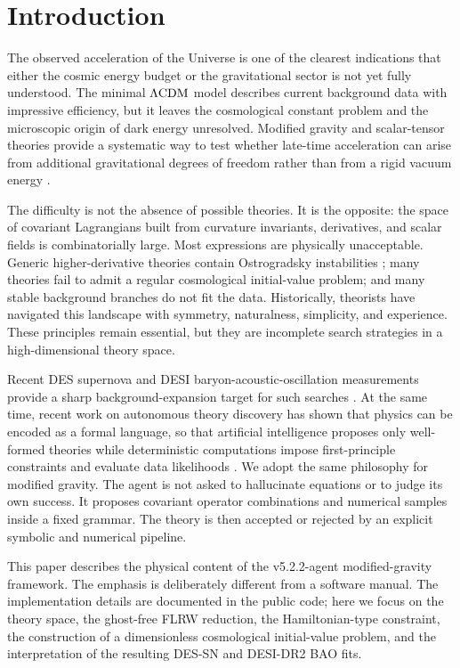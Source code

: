 \documentclass[aps,prd,twocolumn,superscriptaddress,nofootinbib,longbibliography]{revtex4-2}
\newcommand{\LCDM}{\Lambda{\rm CDM}}
\begin{document}
\section{Introduction}
\label{sec:introduction}

The observed acceleration of the Universe is one of the clearest indications that either the cosmic energy budget or the gravitational sector is not yet fully understood.  The minimal $\LCDM$ model describes current background data with impressive efficiency, but it leaves the cosmological constant problem and the microscopic origin of dark energy unresolved.  Modified gravity and scalar-tensor theories provide a systematic way to test whether late-time acceleration can arise from additional gravitational degrees of freedom rather than from a rigid vacuum energy \cite{Clifton2012,SotiriouFaraoni2010,Horndeski1974}.

The difficulty is not the absence of possible theories.  It is the opposite: the space of covariant Lagrangians built from curvature invariants, derivatives, and scalar fields is combinatorially large.  Most expressions are physically unacceptable.  Generic higher-derivative theories contain Ostrogradsky instabilities \cite{Ostrogradsky1850}; many theories fail to admit a regular cosmological initial-value problem; and many stable background branches do not fit the data.  Historically, theorists have navigated this landscape with symmetry, naturalness, simplicity, and experience.  These principles remain essential, but they are incomplete search strategies in a high-dimensional theory space.

Recent DES supernova and DESI baryon-acoustic-oscillation measurements provide a sharp background-expansion target for such searches \cite{DES2024SN,DESI2025BAO}.  At the same time, recent work on autonomous theory discovery has shown that physics can be encoded as a formal language, so that artificial intelligence proposes only well-formed theories while deterministic computations impose first-principle constraints and evaluate data likelihoods \cite{Alexander2026Albert}.  We adopt the same philosophy for modified gravity.  The agent is not asked to hallucinate equations or to judge its own success.  It proposes covariant operator combinations and numerical samples inside a fixed grammar.  The theory is then accepted or rejected by an explicit symbolic and numerical pipeline.

This paper describes the physical content of the v5.2.2-agent modified-gravity framework.  The emphasis is deliberately different from a software manual.  The implementation details are documented in the public code; here we focus on the theory space, the ghost-free FLRW reduction, the Hamiltonian-type constraint, the construction of a dimensionless cosmological initial-value problem, and the interpretation of the resulting DES-SN and DESI-DR2 BAO fits.
\end{document}
